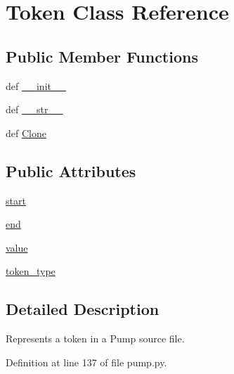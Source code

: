 \hypertarget{classpump_1_1Token}{\section{\-Token \-Class \-Reference}
\label{d2/ddc/classpump_1_1Token}
}
\subsection*{\-Public \-Member \-Functions}
\begin{DoxyCompactItemize}
\item 
def \hyperlink{classpump_1_1Token_ac775ee34451fdfa742b318538164070e}{\-\_\-\-\_\-init\-\_\-\-\_\-}
\item 
def \hyperlink{classpump_1_1Token_aa7a4b9bc0941308e362738503137460e}{\-\_\-\-\_\-str\-\_\-\-\_\-}
\item 
def \hyperlink{classpump_1_1Token_aff981755ef197de06774d0c1cf6cceb9}{\-Clone}
\end{DoxyCompactItemize}
\subsection*{\-Public \-Attributes}
\begin{DoxyCompactItemize}
\item 
\hyperlink{classpump_1_1Token_a550769bbd4e7537ff90a656f5b0c23b2}{start}
\item 
\hyperlink{classpump_1_1Token_afb358f48b1646c750fb9da6c6585be2b}{end}
\item 
\hyperlink{classpump_1_1Token_afcc7a4b78ecd8fa7e713f8cfa0f51017}{value}
\item 
\hyperlink{classpump_1_1Token_afe5ef662303b6b710ea6ee1a944bad0d}{token\-\_\-type}
\end{DoxyCompactItemize}


\subsection{\-Detailed \-Description}
\begin{DoxyVerb}Represents a token in a Pump source file.\end{DoxyVerb}
 

\-Definition at line 137 of file pump.\-py.



